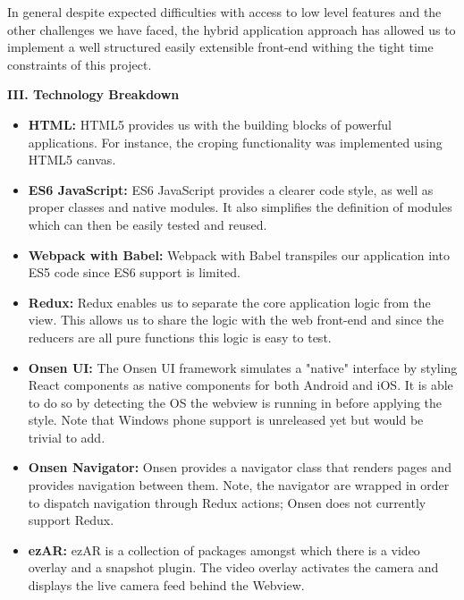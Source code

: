 In general despite expected difficulties with access to low level features and the other challenges we have faced, the hybrid application approach has allowed us to implement a well structured easily extensible front-end withing the tight time constraints of this project.

\textbf{III. Technology Breakdown}
\begin{itemize}
  \item \textbf{HTML:} HTML5 provides us with the building blocks of powerful  applications. For instance, the croping functionality was implemented using HTML5 canvas.
  \item \textbf{ES6 JavaScript:} ES6 JavaScript provides a clearer code style, as well as proper classes and native modules. It also simplifies the definition of modules which can then be easily tested and reused.
  \item \textbf{Webpack with Babel:} Webpack with Babel transpiles our application into ES5 code since ES6 support is limited.
  \item \textbf{Redux:} Redux enables us to separate the core application logic from the view. This allows us to share the logic with the web front-end and since the reducers are all pure functions this logic is easy to test.
  \item \textbf{Onsen UI:} The Onsen UI framework simulates a "native" interface by styling React components as native components for both Android and iOS. It is able to do so by detecting the OS the webview is running in before applying the style. Note that Windows phone support is unreleased yet but would be trivial to add.
  \item \textbf{Onsen Navigator:} Onsen provides a navigator class that renders pages and provides navigation between them. Note, the navigator are wrapped in order to dispatch navigation through Redux actions; Onsen does not currently support Redux.
  \item \textbf{ezAR:} ezAR is a collection of packages amongst which there is a video overlay and a snapshot plugin. The video overlay activates the camera and displays the live camera feed behind the Webview.
\end{itemize}

